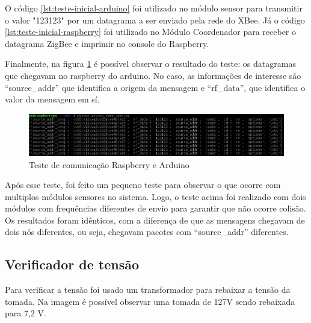  O código \ref{lst:teste-inicial-arduino} foi utilizado no módulo sensor para transmitir o valor "123123" por um datagrama a ser enviado pela rede do XBee. Já o código \ref{lst:teste-inicial-raspberry} foi utilizado no Módulo Coordenador para receber o datagrama ZigBee e imprimir no console do Raspberry.





Finalmente, na figura \ref{fig:raspberry-arduino-1} é possível observar o resultado do teste: os datagramas que chegavam no raspberry do arduino. No caso, as informações de interesse são ``source\_addr'' que identifica a origem da mensagem e ``rf\_data'', que identifica o valor da mensagem em sí.

\begin{figure}[H]
\centering
\includegraphics[width=1\textwidth]{figuras/teste-inicial-raspberry-arduino.png}
\caption{\label{fig:raspberry-arduino-1} Teste de comunicação Raspberry e Arduino}
\end{figure}

Após esse teste, foi feito um pequeno teste para observar o que ocorre com multiplos módulos sensores no sistema. Logo, o teste acima foi realizado com dois módulos com frequências diferentes de envio para garantir que não ocorre colisão. Os resultados foram idênticos, com a diferença de que as mensagens chegavam de dois nós diferentes, ou seja, chegavam pacotes com ``source\_addr'' diferentes.

\subsection{Verificador de tensão}

Para verificar a tensão foi usado um transformador para rebaixar a tensão da tomada. Na imagem é possível observar uma tomada de 127V sendo rebaixada para 7,2 V.

